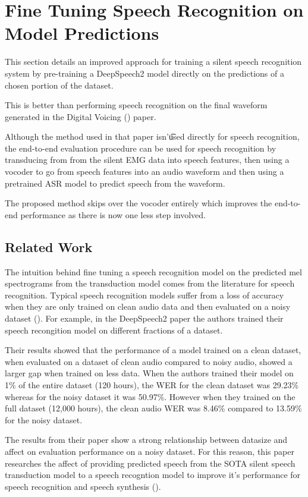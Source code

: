 \section{Fine Tuning Speech Recognition on Model Predictions}

This section details an improved approach for training a silent speech
recognition system by pre-training a DeepSpeech2 model directly on the
predictions of a chosen portion of the dataset.

This is better than performing
speech recognition on the final waveform generated in the Digital Voicing
(\cite{gaddy2020digital}) paper.

Although the method used in that paper isn'\t
used directly for speech recognition, the end-to-end evaluation procedure
can be used for speech recognition by transducing from from the silent EMG
data into speech features, then using a vocoder to go from speech features
into an audio waveform and then using a pretrained ASR model to predict speech
from the waveform.

The proposed method skips over the vocoder entirely which improves the
end-to-end performance as there is now one less step involved.

\subsection{Related Work}

The intuition behind fine tuning a speech recognition model on the
predicted mel spectrograms from the transduction model comes
from the literature for speech recognition. Typical speech recognition models
suffer from a loss of accuracy when they are only trained on clean audio data
and then evaluated on a noisy dataset (\cite{DS2_original}). For example,
in the DeepSpeech2 paper the authors trained their speech recongition
model on different fractions of a dataset.

Their results showed that the
performance of a model trained on a clean dataset, when evaluated on a dataset
of clean audio compared to noisy audio, showed a larger gap when trained on less
data. When the authors trained their model on 1\% of the entire dataset (120 hours),
the WER for the clean dataset was 29.23\% whereas for the noisy dataset it was 50.97\%.
However when they trained on the full dataset (12,000 hours), the clean audio
WER was 8.46\% compared to 13.59\% for the noisy dataset.

The results from their paper show a strong relationship between datasize and
affect on evaluation performance on a noisy dataset. For this reason, this paper
researches the affect of providing predicted speech from the SOTA silent speech
transduction model to a speech recogntion model to improve it's performance for
speech recognition and speech synthesis (\cite{DS2_original}).

